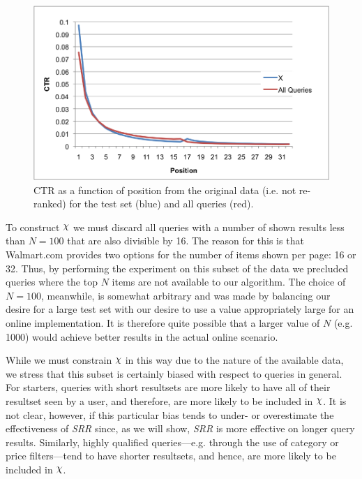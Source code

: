 \documentclass{article}
\def\Chi{\raisebox{2pt}{$\chi$}}
\begin{document}
\begin{figure}[htbp!]
    \centering
    \includegraphics[width=\textwidth]{CTRcompare.png}
    \protect\caption{CTR as a function of position from the original data (i.e.
    not re-ranked) for the test set \protect\raisebox{2pt}{$\chi$} (blue) and
    all queries (red).}
    \label{fig:ctr_vs_position}
\end{figure}

To construct $\Chi$ we  must discard all queries with a number of shown results
less than $N=100$ that are also divisible by 16. The reason for this is that
Walmart.com provides two options for the number of items shown per page: 16 or
32. Thus, by performing the experiment on this subset of the data we precluded
queries where the top $N$ items are not available to our algorithm.  The choice
of $N=100$, meanwhile, is somewhat arbitrary and was made by balancing our
desire for a large test set with our desire to use a value appropriately large
for an online implementation. It is therefore quite possible that a larger value
of $N$ (e.g. 1000) would achieve better results in the actual online scenario.

While we must constrain $\Chi$ in this way due to the nature of the available
data, we stress that this subset is certainly biased with respect to queries in
general. For starters, queries with short resultsets are more likely to have all
of their resultset seen by a user, and therefore, are more likely to be included
in $\Chi$. It is not clear, however, if this particular bias tends to under- or
overestimate the effectiveness of {\em SRR} since, as we will show, {\em SRR} is
more effective on longer query results. Similarly, highly qualified
queries---e.g. through the use of category or price filters---tend to have
shorter resultsets, and hence, are more likely to be included in $\Chi$.
\end{document}
